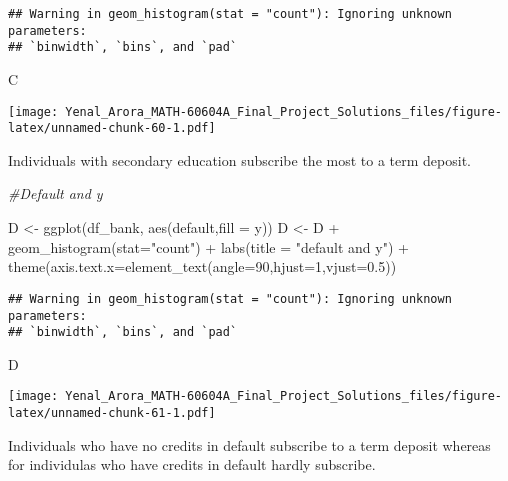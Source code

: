\documentclass[
]{article}
\newenvironment{Shaded}{\begin{snugshade}}{\end{snugshade}}
\newcommand{\AttributeTok}[1]{\textcolor[rgb]{0.77,0.63,0.00}{#1}}
\newcommand{\CommentTok}[1]{\textcolor[rgb]{0.56,0.35,0.01}{\textit{#1}}}
\newcommand{\DecValTok}[1]{\textcolor[rgb]{0.00,0.00,0.81}{#1}}
\newcommand{\FloatTok}[1]{\textcolor[rgb]{0.00,0.00,0.81}{#1}}
\newcommand{\FunctionTok}[1]{\textcolor[rgb]{0.00,0.00,0.00}{#1}}
\newcommand{\NormalTok}[1]{#1}
\newcommand{\OtherTok}[1]{\textcolor[rgb]{0.56,0.35,0.01}{#1}}
\newcommand{\SpecialCharTok}[1]{\textcolor[rgb]{0.00,0.00,0.00}{#1}}
\newcommand{\StringTok}[1]{\textcolor[rgb]{0.31,0.60,0.02}{#1}}
\begin{document}
\begin{verbatim}
## Warning in geom_histogram(stat = "count"): Ignoring unknown parameters:
## `binwidth`, `bins`, and `pad`
\end{verbatim}

\begin{Shaded}
\begin{Highlighting}[]
\NormalTok{C}
\end{Highlighting}
\end{Shaded}

\texttt{[image: Yenal\_Arora\_MATH-60604A\_Final\_Project\_Solutions\_files/figure-latex/unnamed-chunk-60-1.pdf]}

Individuals with secondary education subscribe the most to a term
deposit.

\begin{Shaded}
\begin{Highlighting}[]
\CommentTok{\#Default and y}

\NormalTok{D }\OtherTok{\textless{}{-}} \FunctionTok{ggplot}\NormalTok{(df\_bank, }\FunctionTok{aes}\NormalTok{(default,}\AttributeTok{fill =}\NormalTok{ y))}
\NormalTok{D }\OtherTok{\textless{}{-}}\NormalTok{ D }\SpecialCharTok{+} \FunctionTok{geom\_histogram}\NormalTok{(}\AttributeTok{stat=}\StringTok{"count"}\NormalTok{) }\SpecialCharTok{+} \FunctionTok{labs}\NormalTok{(}\AttributeTok{title =} \StringTok{"default and y"}\NormalTok{) }\SpecialCharTok{+}
  \FunctionTok{theme}\NormalTok{(}\AttributeTok{axis.text.x=}\FunctionTok{element\_text}\NormalTok{(}\AttributeTok{angle=}\DecValTok{90}\NormalTok{,}\AttributeTok{hjust=}\DecValTok{1}\NormalTok{,}\AttributeTok{vjust=}\FloatTok{0.5}\NormalTok{))}
\end{Highlighting}
\end{Shaded}

\begin{verbatim}
## Warning in geom_histogram(stat = "count"): Ignoring unknown parameters:
## `binwidth`, `bins`, and `pad`
\end{verbatim}

\begin{Shaded}
\begin{Highlighting}[]
\NormalTok{D}
\end{Highlighting}
\end{Shaded}

\texttt{[image: Yenal\_Arora\_MATH-60604A\_Final\_Project\_Solutions\_files/figure-latex/unnamed-chunk-61-1.pdf]}

Individuals who have no credits in default subscribe to a term deposit
whereas for individulas who have credits in default hardly subscribe.
\end{document}
